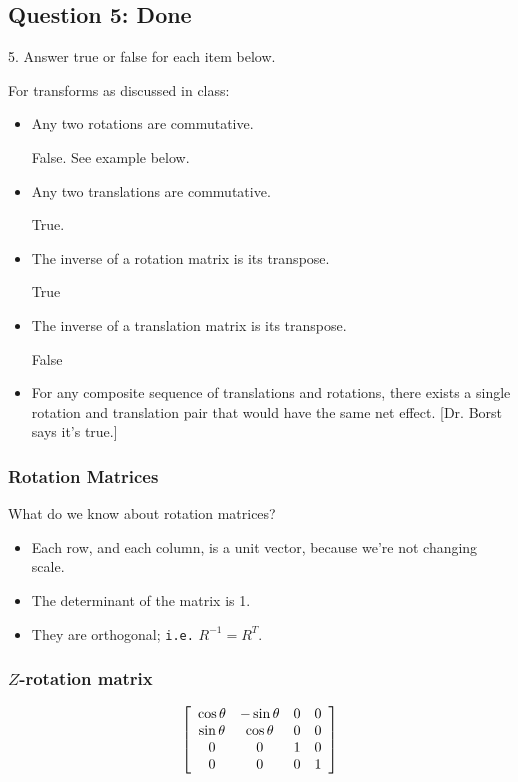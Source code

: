 \documentclass[11pt]{article}
\begin{document}
\begin{spacing}{1.2}
\subsection{Question 5:  Done}
5.  Answer true or false for each item below.  

For transforms as discussed in class:

\begin{itemize}
	\item Any two rotations are commutative.
	
	False.  See example below. 
	\item Any two translations are commutative.
	
	True.
	\item The inverse of a rotation matrix is its transpose.  
	
	True
	\item The inverse of a translation matrix is its transpose.  
	
	False
	\item For any composite sequence of translations and rotations, there exists a single rotation and translation pair that would have the same net effect.  [Dr. Borst says it's true.]
\end{itemize}

\subsubsection{Rotation Matrices}

What do we know about rotation matrices?

\begin{itemize}
	\item Each row, and each column, is a unit vector, because we're not changing scale.
	\item The determinant of the matrix is 1.
	\item They are orthogonal; {\tt i.e.} $R^{-1} = R^T$.
\end{itemize}

\subsubsection{$Z$-rotation matrix}

$$
\left[
\begin{array}{cccc}
	\cos \theta & - \sin \theta & 0 & 0 \cr
	\sin \theta & \cos \theta & 0 & 0 \cr
	0 & 0 & 1 & 0 \cr
	0 & 0 & 0 & 1 \cr
\end{array}
\right]
$$


\end{spacing}
\end{document}
